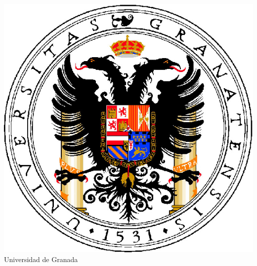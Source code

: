 \documentclass[b5paper,twoside,10pt]{book}
\begin{document}
\hfill
\begin{minipage}[t]{.23\textwidth}
\centering
\includegraphics[width=.83\textwidth]{escudo_ugr_portada}
 Universidad de Granada
\end{minipage}
\end{document}
